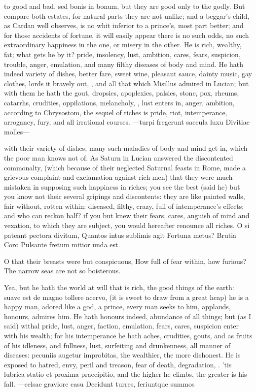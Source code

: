 {to good and bad, sed bonis in bonum, but they are good only to the
godly. But compare both estates, for natural parts they are not
unlike; and a beggar's child, as Cardan well observes, is no whit
inferior to a prince's, most part better; and for those accidents of
fortune, it will easily appear there is no such odds, no such
extraordinary happiness in the one, or misery in the other. He is rich,
wealthy, fat; what gets he by it? pride, insolency, lust, ambition,
cares, fears, suspicion, trouble, anger, emulation, and many filthy
diseases of body and mind. He hath indeed variety of dishes, better
fare, sweet wine, pleasant sauce, dainty music, gay clothes, lords it
bravely out, \etc{}, and all that which Misillus admired in Lucian;
but with them he hath the gout, dropsies, apoplexies, palsies, stone,
pox, rheums, catarrhs, crudities, oppilations, melancholy, \etc{},
lust enters in, anger, ambition, according to Chrysostom, the
sequel of riches is pride, riot, intemperance, arrogancy, fury, and all
irrational courses.
---turpi fregerunt saecula luxu
Divitiae molles---

with their variety of dishes, many such maladies of body and mind get
in, which the poor man knows not of. As Saturn in Lucian answered
the discontented commonalty, (which because of their neglected Saturnal
feasts in Rome, made a grievous complaint and exclamation against rich
men) that they were much mistaken in supposing such happiness in
riches; you see the best (said he) but you know not their several
gripings and discontents: they are like painted walls, fair without,
rotten within: diseased, filthy, crazy, full of intemperance's effects;
and who can reckon half? if you but knew their fears, cares,
anguish of mind and vexation, to which they are subject, you would
hereafter renounce all riches.
O si pateant pectora divitum,
Quantos intus sublimis agit
Fortuna metus? Brutia Coro
Pulsante fretum mitior unda est.

O that their breasts were but conspicuous,
How full of fear within, how furious?
The narrow seas are not so boisterous.

Yea, but he hath the world at will that is rich, the good things of the
earth: suave est de magno tollere acervo, (it is sweet to draw from a
great heap) he is a happy man, adored like a god, a prince, every
man seeks to him, applauds, honours, admires him. He hath honours
indeed, abundance of all things; but (as I said) withal pride,
lust, anger, faction, emulation, fears, cares, suspicion enter with his
wealth; for his intemperance he hath aches, crudities, gouts, and as
fruits of his idleness, and fullness, lust, surfeiting and drunkenness,
all manner of diseases: pecuniis augetur improbitas, the wealthier, the
more dishonest. He is exposed to hatred, envy, peril and treason,
fear of death, degradation, \etc{}. 'tis lubrica statio et proxima
praecipitio, and the higher he climbs, the greater is his fall.
---celsae graviore casu
Decidunt turres, feriuntque summos

}
